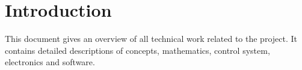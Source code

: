 \section{Introduction}
This document gives an overview of all technical work related to the project. It contains detailed descriptions of concepts, mathematics, control system, electronics and software.
